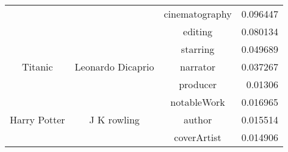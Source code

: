 \begin{table}[ht!]
\begin{tabular}{cccr}
    \multicolumn{1}{c}{} & \multicolumn{1}{c}{} & cinematography & 0.096447 \\
    \multicolumn{1}{c}{} & \multicolumn{1}{c}{} & editing & 0.080134 \\
    \hline
    \multicolumn{1}{c}{\multirow{3}{*}{Titanic}} & \multicolumn{1}{c}{\multirow{3}[0]{*}{Leonardo Dicaprio}} & starring & 0.049689 \\
    \multicolumn{1}{c}{} & \multicolumn{1}{c}{} & narrator & 0.037267 \\
    \multicolumn{1}{c}{} & \multicolumn{1}{c}{} & producer & 0.01306 \\
    \hline
    \multicolumn{1}{c}{\multirow{3}{*}{\parbox{1cm}{\centering Harry Potter}}} & \multicolumn{1}{c}{\multirow{3}[0]{*}{J K rowling}} & notableWork & 0.016965 \\
    \multicolumn{1}{c}{} & \multicolumn{1}{c}{} & author & 0.015514 \\
    \multicolumn{1}{c}{} & \multicolumn{1}{c}{} & coverArtist & 0.014906 \\
    \bottomrule
    \end{tabular}%
  \label{tab:results}%
\end{table}%


